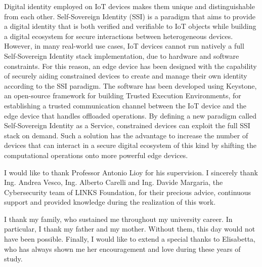 \documentclass[pdfa%
,twoside%
,12pt%
]{toptesi}
\begin{document}
Digital identity employed on IoT devices makes them unique and distinguishable from each other. Self-Sovereign Identity (SSI) is a paradigm that aims to provide a digital identity that is both verified and verifiable to IoT objects while building a digital ecosystem for secure interactions between heterogeneous devices. However, in many real-world use cases, IoT devices cannot run natively a full Self-Sovereign Identity stack implementation, due to hardware and software constraints. For this reason, an edge device has been designed with the capability of securely aiding constrained devices to create and manage their own identity according to the SSI paradigm. The software has been developed using Keystone, an open-source framework for building Trusted Execution Environments, for establishing a trusted communication channel between the IoT device and the edge device that handles offloaded operations. By defining a new paradigm called Self-Sovereign Identity as a Service, constrained devices can exploit the full SSI stack on demand. Such a solution has the advantage to increase the number of devices that can interact in a secure digital ecosystem of this kind by shifting the computational operations onto more powerful edge devices. 

\ringraziamenti

I would like to thank Professor Antonio Lioy for his supervision. I sincerely thank Ing. Andrea Vesco, Ing. Alberto Carelli and Ing. Davide Margaria, the Cybersecurity team of LINKS Foundation, for their precious advice, continuous support and provided knowledge during the realization of this work. 

I thank my family, who sustained me throughout my university career. In particular, I thank my father and my mother. Without them, this day would not have been possible. Finally, I would like to extend a special thanks to Elisabetta, who has always shown me her encouragement and love during these years of study.

\end{document}
